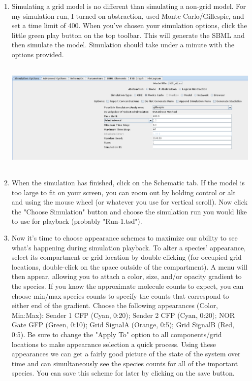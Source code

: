 \documentclass[titlepage,11pt]{article}
\begin{document}
\begin{enumerate}

\item Simulating a grid model is no different than simulating a non-grid model.  For my simulation run, I turned on abstraction, used Monte Carlo/Gillespie, and set a time limit of 400.  When you've chosen your simulation options, click the little green play button on the top toolbar.  This will generate the SBML and then simulate the model.  Simulation should take under a minute with the options provided.

\includegraphics[height=55mm]{screenshots/newgrid/grid_sim_options}

\item When the simulation has finished, click on the Schematic tab.  If the model is too large to fit on your screen, you can zoom out by holding control or alt and using the mouse wheel (or whatever you use for vertical scroll).  Now click the "Choose Simulation" button and choose the simulation run you would like to use for playback (probably "Run-1.tsd").

\item Now it's time to choose appearance schemes to maximize our ability to see what's happening during simulation playback.  To alter a species' appearance, select its compartment or grid location by double-clicking (for occupied grid locations, double-click on the space outside of the compartment).  A menu will then appear, allowing you to attach a color, size, and/or opacity gradient to the species.  If you know the approximate molecule counts to expect, you can choose min/max species counts to specify the counts that correspond to either end of the gradient.  Choose the following appearances (Color, Min:Max): Sender 1 CFP (Cyan, 0:20); Sender 2 CFP (Cyan, 0:20); NOR Gate GFP (Green, 0:10); Grid SignalA (Orange, 0:5); Grid SignalB (Red, 0:5).  Be sure to change the "Apply To" option to all components/grid locations to make appearance selection a quick process.  Using these appearances we can get a fairly good picture of the state of the system over time and can simultaneously see the species counts for all of the important species.  You can save this scheme for later by clicking on the save button.


\end{enumerate}
\end{document}
